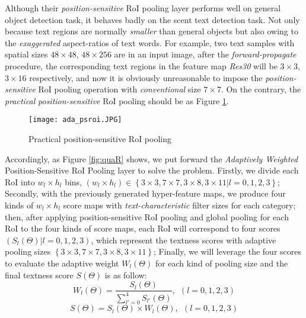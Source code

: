 \documentclass[letterpaper]{article}
\begin{document}
Although their \textit{position-sensitive} RoI pooling layer performs well on general object detection task, it behaves badly on the scent text detection task. Not only because text regions are normally \textit{smaller} than general objects but also owing to the \textit{exaggerated} aspect-ratios of text words. For example, two text samples with spatial sizes $48\times48$, $48\times256$ are in an input image, after the \textit{forward-propagate} procedure, the corresponding text regions in the feature map \textit{Res30} will be $3\times3$, $3\times16$ respectively, and now it is obviously unreasonable to impose the \textit{position-sensitive} RoI pooling operation with \textit{conventional} size $7\times7$. On the contrary, the \textit{practical} \textit{position-sensitive} RoI pooling should be as Figure \ref{fig:prac}.
\begin{figure}[h]
\begin{center}
\texttt{[image: ada\_psroi.JPG]}
\caption{Practical position-sensitive RoI pooling}\label{fig:prac}
\end{center}
\end{figure}
Accordingly, as Figure \ref{fig:quaR} shows, we put forward the \textit{Adaptively Weighted} Position-Sensitive RoI Pooling layer to solve the problem. Firstly, we divide each RoI into $w_l \times h_l$ bins, $\left(w_l\times h_l\right)\in\left\{3\times 3, 7\times 7, 3\times 8, 3\times 11 | l=0,1,2,3\right\}$; Secondly, with the previously generated hyper-feature maps, we produce four kinds of $w_l \times h_l$ score maps with \textit{text-characteristic} filter sizes for each category; then, after applying position-sensitive RoI pooling and global pooling for each RoI to the four kinds of score maps, each RoI will correspond to four scores $\left(S_l\left(\Theta\right)|l=0,1,2,3\right)$, which represent the textness scores with adaptive pooling sizes $\left\{3\times 3, 7\times 7, 3\times 8, 3\times 11\right\}$; Finally, we will leverage the four scores to evaluate the adaptive weight $W_l\left(\Theta\right)$ for each kind of pooling size and the final textness score $S\left(\Theta\right)$ is as follow:
\begin{equation}\label{ada_w}
W_l\left(\Theta\right)=\frac{S_l\left(\Theta\right)}{\sum\limits_{l'=0}^4{S_{l'}\left(\Theta\right)}}, \ \  \left(l=0,1,2,3\right)
\end{equation}
\begin{equation}\label{ada_s}
S\left(\Theta\right)=S_l\left(\Theta\right)\times {W_l\left(\Theta\right)}, \ \  \left(l=0,1,2,3\right)
\end{equation}
\end{document}
